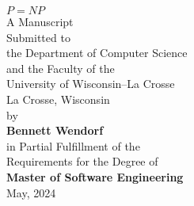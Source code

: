 \begin{titlepage}
	\begin{center}
		\vspace*{0.5in}
		\begin{doublespace}
			\LARGE \textbf{\(P = NP\)} \\ %
			\vspace*{1in}
			\normalsize
			A Manuscript \\
			Submitted to \\
			the Department of Computer Science \\
			and the Faculty of the\\
			University of Wisconsin--La Crosse \\
			La Crosse, Wisconsin \\
			\vspace*{0.5in}
			by \\
			\large
			\textbf{Bennett Wendorf} \\

			\vspace*{0.5in}
			\normalsize
			in Partial Fulfillment of the \\
			Requirements for the Degree of\\
			\Large{\textbf{Master of Software Engineering}} \\
			\normalsize
			May, 2024
		\end{doublespace}
	\end{center}
\end{titlepage}
